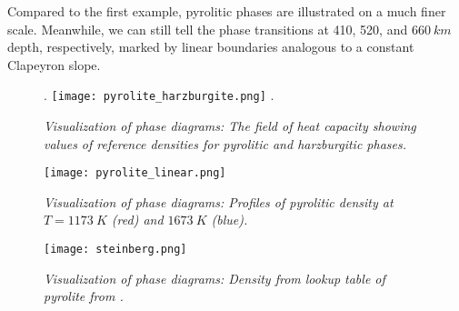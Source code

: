 Compared to the first example, pyrolitic phases are illustrated on a much finer scale.  %
Meanwhile, we can still tell the phase transitions at 410, 520, and $\SI{660}{km}$ depth, respectively, marked by linear boundaries analogous to a constant Clapeyron slope.


\begin{figure}
\phantom.
\hfill
\texttt{[image: pyrolite\_harzburgite.png]}
\hfill
\phantom.
\caption{\it Visualization of phase diagrams: The field of heat capacity showing values of reference densities for pyrolitic and harzburgitic phases.}
\label{fig:phase_diagram_ph_density}
\end{figure}

\begin{figure}
\centering
\texttt{[image: pyrolite\_linear.png]}
\caption{\it Visualization of phase diagrams: Profiles of pyrolitic density at $T=\SI{1173}{K}$ (red) and $\SI{1673}{K}$ (blue).}
\label{fig:phase_diagram_ph_profile}
\end{figure}
\begin{figure}
\centering
\texttt{[image: steinberg.png]}
\caption{\it Visualization of phase diagrams: Density from lookup table of pyrolite from \cite{stixrude2011thermodynamics}.} %
\label{fig:phase_diagram_steinberg_density}
\end{figure}
